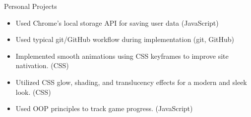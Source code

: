 \documentclass{resume} %
\begin{document}
\begin{workSection}{Personal Projects}
    \customItem[
        title=To Do List Webapp,
        duration=Fall 2022,
        keyHighlight=Developed interactive to-do list webapp with local save function through vanilla HTML{,} CSS \& JS
    ]
    \begin{itemize}
        \vspace{-0.5em}
        \itemsep -6pt {}
        \item Used Chrome's local storage API for saving user data (JavaScript)
        \item Used typical git/GitHub workflow during implementation (git, GitHub)
    \end{itemize}
    \customItem[
    title=Tic Tac Toe webapp,
    duration=Fall 2022,
    keyHighlight=Minimal Tic-Tac-Toe game supporting human-human{,} human-bot{,} and bot-bot game-modes.
    ]
    \begin{itemize}
        \item Implemented smooth animations using CSS keyframes to improve site nativation. (CSS)
        \item Utilized CSS glow{,} shading{,} and translucency effects for a modern and sleek look. (CSS)
        \item Used OOP principles to track game progress. (JavaScript)
    \end{itemize}
\end{workSection}
\end{document}

